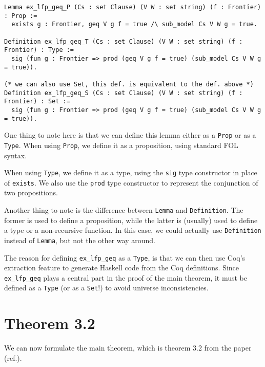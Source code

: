 \begin{minipage}{\linewidth}
\begin{lstlisting}[language=Coq, label={lst:ex_lfp_geq_def}, caption={Multiple defs. of \lstinline{ex_lfp_geq}}]
Lemma ex_lfp_geq_P (Cs : set Clause) (V W : set string) (f : Frontier) : Prop :=
  exists g : Frontier, geq V g f = true /\ sub_model Cs V W g = true.

Definition ex_lfp_geq_T (Cs : set Clause) (V W : set string) (f : Frontier) : Type :=
  sig (fun g : Frontier => prod (geq V g f = true) (sub_model Cs V W g = true)).

(* we can also use Set, this def. is equivalent to the def. above *)
Definition ex_lfp_geq_S (Cs : set Clause) (V W : set string) (f : Frontier) : Set :=
  sig (fun g : Frontier => prod (geq V g f = true) (sub_model Cs V W g = true)).
\end{lstlisting}
\end{minipage}

One thing to note here is that we can define this lemma either as a \lstinline{Prop} or as a \lstinline{Type}.
When using \lstinline{Prop}, we define it as a proposition, using standard FOL syntax.

When using \lstinline{Type}, we define it as a type,
using the \lstinline{sig} type constructor in place of \lstinline{exists}.
We also use the \lstinline{prod} type constructor to represent the conjunction of two propositions.

Another thing to note is the difference between \lstinline{Lemma} and \lstinline{Definition}.
The former is used to define a proposition, while the latter is (usually) used to define a type or a non-recursive function.
In this case, we could actually use \lstinline{Definition} instead of \lstinline{Lemma},
but not the other way around.

The reason for defining \lstinline{ex_lfp_geq} as a \lstinline{Type}, is that we can then use
Coq's extraction feature to generate Haskell code from the Coq definitions.
Since \lstinline{ex_lfp_geq} plays a central part in the proof of the main theorem,
it must be defined as a \lstinline{Type} (or as a \lstinline{Set}!) to avoid universe inconsistencies.

\section{Theorem 3.2}

We can now formulate the main theorem, which is theorem 3.2 from the paper (ref.).

